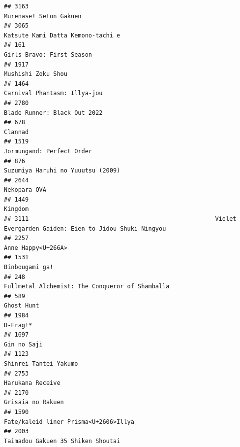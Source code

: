 \documentclass[
]{article}
\begin{document}
\begin{verbatim}
## 3163                                                                                    Murenase! Seton Gakuen
## 3065                                                                         Katsute Kami Datta Kemono-tachi e
## 161                                                                                  Girls Bravo: First Season
## 1917                                                                                        Mushishi Zoku Shou
## 1464                                                                              Carnival Phantasm: Illya-jou
## 2780                                                                              Blade Runner: Black Out 2022
## 678                                                                                                    Clannad
## 1519                                                                                 Jormungand: Perfect Order
## 876                                                                          Suzumiya Haruhi no Yuuutsu (2009)
## 2644                                                                                              Nekopara OVA
## 1449                                                                                                   Kingdom
## 3111                                                     Violet Evergarden Gaiden: Eien to Jidou Shuki Ningyou
## 2257                                                                                        Anne Happy<U+266A>
## 1531                                                                                            Binbougami ga!
## 248                                                            Fullmetal Alchemist: The Conqueror of Shamballa
## 589                                                                                                 Ghost Hunt
## 1984                                                                                                  D-Frag!*
## 1697                                                                                               Gin no Saji
## 1123                                                                                     Shinrei Tantei Yakumo
## 2753                                                                                          Harukana Receive
## 2170                                                                                         Grisaia no Rakuen
## 1590                                                                     Fate/kaleid liner Prisma<U+2606>Illya
## 2003                                                                         Taimadou Gakuen 35 Shiken Shoutai

\end{verbatim}
\end{document}
